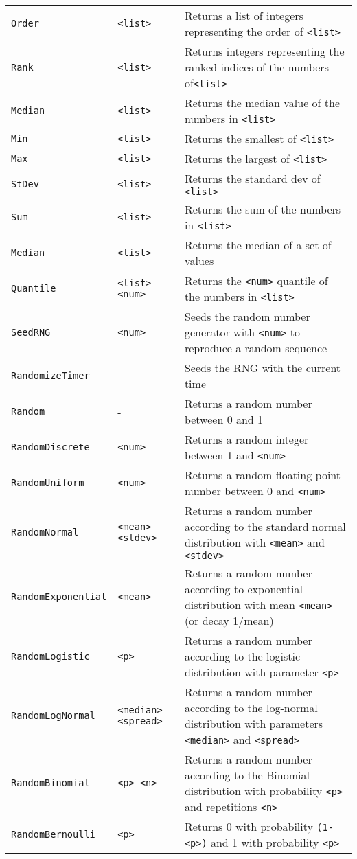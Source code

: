 \begin{longtable}{p{3cm}p{3cm}p{6cm}}
\texttt{Order}     &\verb+<list>+      &Returns a list of integers representing the order of \verb+<list>+\\
\texttt{Rank}     &\verb+<list>+       &Returns integers representing the ranked indices of the numbers of\verb+<list>+\\
\texttt{Median}     &\verb+<list>+     &Returns the median value of the numbers in \verb+<list>+\\
\texttt{Min}      &\verb+<list>+       &Returns the smallest of \verb+<list>+\\ 
\texttt{Max}      &\verb+<list>+       &Returns the largest of \verb+<list>+\\
\texttt{StDev}    &\verb+<list>+       &Returns the standard dev of \verb+<list>+ \\
\texttt{Sum}     &\verb+<list>+        &Returns the sum of the numbers in \verb+<list>+\\
\texttt{Median}   &\verb+<list>+       &Returns the median of a set of values \\
\texttt{Quantile} &\verb+<list> <num>+ &Returns the \verb+<num>+ quantile of the numbers in \verb+<list>+\\
\texttt{SeedRNG}  &\verb+<num>+        &Seeds the random number generator with \verb+<num>+ to reproduce a random sequence\\ 
\texttt{RandomizeTimer} &  -           & Seeds the RNG with the current time\\
\texttt{Random}         &  -           & Returns a random number between 0 and 1\\
\texttt{RandomDiscrete} &\verb+<num>+  &Returns a random integer  between 1 and \verb+<num>+ \\
\texttt{RandomUniform}  &\verb+<num>+  &Returns a random floating-point number between 0 and \verb+<num>+ \\
\texttt{RandomNormal}   &\verb+<mean> <stdev>+ &Returns a random number according to the standard normal distribution with \verb+<mean>+ and \verb+<stdev>+\\
\texttt{RandomExponential}&\verb+<mean>+ &Returns a random number according to exponential distribution with mean \verb+<mean>+ (or decay 1/mean)\\
\texttt{RandomLogistic} &\verb+<p>+    &Returns a random number according to the logistic distribution with parameter \verb+<p>+\\
\texttt{RandomLogNormal}&\verb+<median> <spread>+ &Returns a random number according to  the log-normal distribution with parameters \verb+<median>+ and \verb+<spread>+\\
\texttt{RandomBinomial} &\verb+<p> <n>+&Returns a random number according to  the Binomial distribution with probability \verb+<p>+ and repetitions \verb+<n>+\\
\texttt{RandomBernoulli}&\verb+<p>+    &Returns 0 with probability \verb+(1-<p>)+ and 1 with probability \verb+<p>+\\



\end{longtable}
